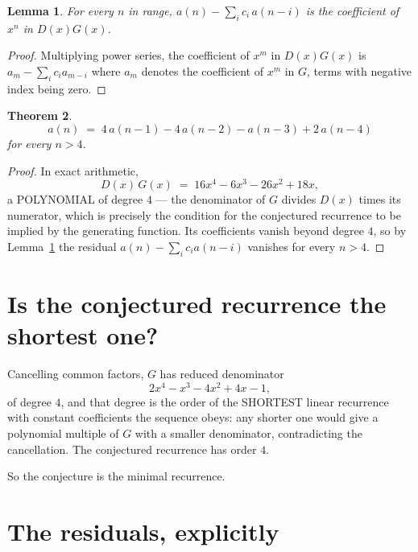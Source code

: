 \documentclass[11pt,a4paper]{article}
\theoremstyle{plain}
\newtheorem{theorem}{Theorem}
\newtheorem{lemma}[theorem]{Lemma}
\theoremstyle{definition}
\begin{document}
\begin{lemma}\label{lem:key}
For every $n$ in range, $a(n)-\sum_i c_i\,a(n-i)$ is the coefficient of $x^{n}$ in
$D(x)G(x)$.
\end{lemma}

\begin{proof}
Multiplying power series, the coefficient of $x^{m}$ in $D(x)G(x)$ is
$a_m-\sum_i c_i a_{m-i}$ where $a_m$ denotes the coefficient of $x^{m}$ in $G$, terms with
negative index being zero.
\end{proof}

\begin{theorem}
\[
a(n)\;=\;4\,a(n-1) - 4\,a(n-2) - a(n-3) + 2\,a(n-4)
\]
for every $n>4$.
\end{theorem}

\begin{proof}
In exact arithmetic,
\[
D(x)\,G(x)\;=\;16 x^{4} - 6 x^{3} - 26 x^{2} + 18 x,
\]
a POLYNOMIAL of degree $4$ --- the denominator of $G$ divides $D(x)$ times its numerator,
which is precisely the condition for the conjectured recurrence to be implied by the
generating function. Its coefficients vanish beyond degree $4$, so by
Lemma~\ref{lem:key} the residual $a(n)-\sum_ic_ia(n-i)$ vanishes for every
$n>4$.
\end{proof}

\section{Is the conjectured recurrence the shortest one?}

Cancelling common factors, $G$ has reduced denominator
\[
2 x^{4} - x^{3} - 4 x^{2} + 4 x - 1,
\]
of degree $4$, and that degree is the order of the SHORTEST linear recurrence with
constant coefficients the sequence obeys: any shorter one would give a polynomial multiple of
$G$ with a smaller denominator, contradicting the cancellation. The conjectured recurrence has
order $4$.

So the conjecture is the minimal recurrence.

\section{The residuals, explicitly}
\end{document}
